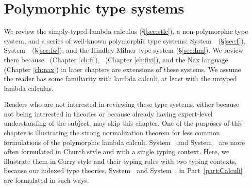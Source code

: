 \chapter{Polymorphic type systems}\label{ch:poly}
We review the simply-typed lambda calculus (\S\ref{sec:stlc}),
a non-polymorphic type system, and
a series of well-known polymorphic type systems:
System~\F\ (\S\ref{sec:f}), System~\Fw\ (\S\ref{sec:fw}),
and the Hindley-Milner type system (\S\ref{sec:hm}).
We review them because \Fi\ (Chapter \ref{ch:fi}),
\Fixi\ (Chapter \ref{ch:fixi}), and the Nax language (Chapter \ref{ch:nax})
in later chapters are extensions of these systems. We assume the reader has
some familiarity with lambda calculi, at least with the untyped lambda calculus.

Readers who are not interested in reviewing these type systems,
either because not being interested in theories
or because already having expert-level understanding of the subject,
may skip this chapter. One of the purposes of this chapter is illustrating
the strong normalization theorem for less common formulations of
the polymorphic lambda calculi. System~\F\ and System~\Fw\ are more often
formulated in Church style and with a single typing context. Here,
we illustrate them in Curry style and their typing rules with two
typing contexts, because our indexed type theories, System~\Fi\ and
System~\Fixi, in Part~\ref{part:Calculi} are formulated in such ways.


